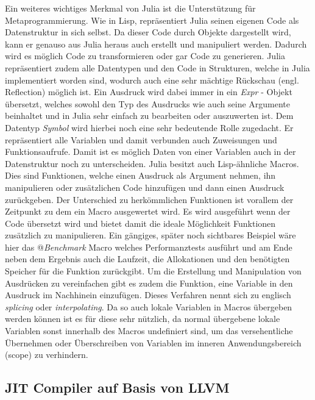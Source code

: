 \documentclass[proseminar,german,utf8]{zihpub}
\begin{document}
Ein weiteres wichtiges Merkmal von Julia ist die Unterstützung für Metaprogrammierung. Wie in Lisp, repräsentiert Julia seinen eigenen Code als Datenstruktur in sich selbst. Da dieser Code durch Objekte dargestellt wird, kann er genauso aus Julia heraus auch erstellt und manipuliert werden. Dadurch wird es möglich Code zu transformieren oder gar Code zu generieren. Julia repräsentiert zudem alle Datentypen und den Code in Strukturen, welche in Julia implementiert worden sind, wodurch auch eine sehr mächtige Rückschau (engl. Reflection) möglich ist. Ein Ausdruck wird dabei immer in ein \textit{Expr} - Objekt übersetzt, welches sowohl den Typ des Ausdrucks wie auch seine Argumente beinhaltet und in Julia sehr einfach zu bearbeiten oder auszuwerten ist. Dem Datentyp \textit{Symbol} wird hierbei noch eine sehr bedeutende Rolle zugedacht. Er repräsentiert alle Variablen und damit verbunden auch Zuweisungen und Funktionsaufrufe. Damit ist es möglich Daten von einer Variablen auch in der Datenstruktur noch zu unterscheiden. Julia besitzt auch Lisp-ähnliche Macros. Dies sind Funktionen, welche einen Ausdruck als Argument nehmen, ihn manipulieren oder zusätzlichen Code hinzufügen und dann einen Ausdruck zurückgeben. Der Unterschied zu herkömmlichen Funktionen ist vorallem der Zeitpunkt zu dem ein Macro ausgewertet wird. Es wird ausgeführt wenn der Code übersetzt wird und bietet damit die ideale Möglichkeit Funktionen zusätzlich zu manipulieren. Ein gängiges, später noch sichtbares Beispiel wäre hier das @\textit{Benchmark} Macro welches Performanztests ausführt und am Ende neben dem Ergebnis auch die Laufzeit, die Allokationen und den benötigten Speicher für die Funktion zurückgibt. Um die Erstellung und Manipulation von Ausdrücken zu vereinfachen gibt es zudem die Funktion, eine Variable in den Ausdruck im Nachhinein einzufügen. Dieses Verfahren nennt sich zu englisch \textit{splicing} oder \textit{interpolating}. Da so auch lokale Variablen in Macros übergeben werden können ist es für diese sehr nützlich, da normal übergebene lokale Variablen sonst innerhalb des Macros undefiniert sind, um das versehentliche Übernehmen oder Überschreiben von Variablen im inneren Anwendungsbereich (scope) zu verhindern.~\cite{JuliaLangDocumentation}~\cite{SyntaxTreeWiki}~\cite{StringInteringWiki}

\subsection{JIT Compiler auf Basis von LLVM}
\end{document}
